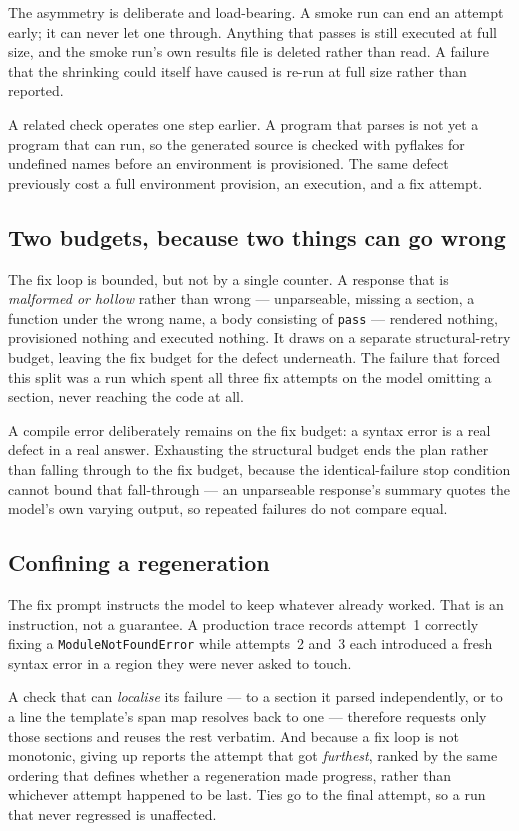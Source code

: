 The asymmetry is deliberate and load-bearing. A smoke run can end an attempt early; it can
never let one through. Anything that passes is still executed at full size, and the smoke
run's own results file is deleted rather than read. A failure that the shrinking could itself
have caused is re-run at full size rather than reported.

A related check operates one step earlier. A program that parses is not yet a program that can
run, so the generated source is checked with pyflakes for undefined names before an environment
is provisioned. The same defect previously cost a full environment provision, an execution, and
a fix attempt.

\subsection{Two budgets, because two things can go wrong}

The fix loop is bounded, but not by a single counter. A response that is \emph{malformed or
hollow} rather than wrong --- unparseable, missing a section, a function under the wrong name,
a body consisting of \texttt{pass} --- rendered nothing, provisioned nothing and executed
nothing. It draws on a separate structural-retry budget, leaving the fix budget for the defect
underneath. The failure that forced this split was a run which spent all three fix attempts on
the model omitting a section, never reaching the code at all.

A compile error deliberately remains on the fix budget: a syntax error is a real defect in a
real answer. Exhausting the structural budget ends the plan rather than falling through to the
fix budget, because the identical-failure stop condition cannot bound that fall-through --- an
unparseable response's summary quotes the model's own varying output, so repeated failures do
not compare equal.

\subsection{Confining a regeneration}

The fix prompt instructs the model to keep whatever already worked. That is an instruction, not
a guarantee. A production trace records attempt~1 correctly fixing a \texttt{ModuleNotFoundError}
while attempts~2 and~3 each introduced a fresh syntax error in a region they were never asked
to touch.

A check that can \emph{localise} its failure --- to a section it parsed independently, or to a
line the template's span map resolves back to one --- therefore requests only those sections and
reuses the rest verbatim. And because a fix loop is not monotonic, giving up reports the attempt
that got \emph{furthest}, ranked by the same ordering that defines whether a regeneration made
progress, rather than whichever attempt happened to be last. Ties go to the final attempt, so a
run that never regressed is unaffected.

